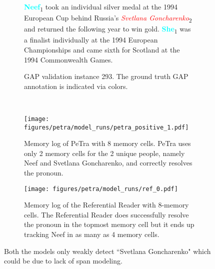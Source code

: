 \documentclass[12pt]{thesis-umich}[thesis]
\newcommand{\hlent}[2]{\colorbox{gray!20}{#1\textsubscript{#2}}}
\begin{document}
\begin{figure}[t]
    \begin{subfigure}[t]{\textwidth}
    \begin{mdframed}
        \hlent{\textcolor{aqua}{\bf Neef}}{1} took an individual silver medal at the 1994 European Cup behind Russia's \hlent{\textcolor{red}{\it Svetlana Goncharenko}}{2} and returned the following year to win gold. \hlent{\textcolor{aqua}{\bf She}}{1} was a finalist individually at the 1994 European Championships and came sixth for Scotland at the 1994 Commonwealth Games.
    \end{mdframed}
    \caption{GAP validation instance 293. The ground truth GAP annotation is indicated via colors.}
    \end{subfigure}
    ~\vspace{0.2in}
    \centering
    \begin{subfigure}[t]{\textwidth}
    \texttt{[image: figures/petra/model\_runs/petra\_positive\_1.pdf]}
    \caption{Memory log of PeTra with 8 memory cells. PeTra uses only 2 memory cells for the 2 unique people, namely Neef and Svetlana Goncharenko, and correctly resolves the pronoun.}
    \end{subfigure}
    \begin{subfigure}[t]{\textwidth}
    \texttt{[image: figures/petra/model\_runs/ref\_0.pdf]}
    \caption{Memory log of the Referential Reader with 8-memory cells. The Referential Reader does successfully resolve the pronoun in the topmost memory cell but it ends up tracking Neef in as many as 4 memory cells.}
    \end{subfigure}
    \caption{
    Both the models only weakly detect ``Svetlana Goncharenko" which could be due to lack of span modeling.}
    \label{fig:petra_vs_ref_1}
\end{figure}
\end{document}
